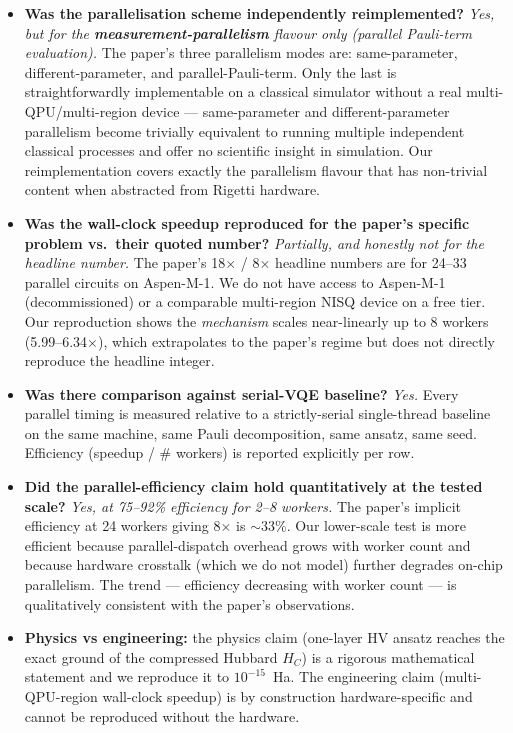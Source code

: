 \documentclass[11pt]{article}
\begin{document}
\begin{itemize}
  \item \textbf{Was the parallelisation scheme independently reimplemented?}
  \emph{Yes, but for the \textbf{measurement-parallelism} flavour only (parallel Pauli-term evaluation).} The paper's three parallelism modes are: same-parameter, different-parameter, and parallel-Pauli-term. Only the last is straightforwardly implementable on a classical simulator without a real multi-QPU/multi-region device --- same-parameter and different-parameter parallelism become trivially equivalent to running multiple independent classical processes and offer no scientific insight in simulation. Our reimplementation covers exactly the parallelism flavour that has non-trivial content when abstracted from Rigetti hardware.

  \item \textbf{Was the wall-clock speedup reproduced for the paper's specific problem vs.\ their quoted number?}
  \emph{Partially, and honestly not for the headline number.} The paper's 18$\times$ / 8$\times$ headline numbers are for 24--33 parallel circuits on Aspen-M-1. We do not have access to Aspen-M-1 (decommissioned) or a comparable multi-region NISQ device on a free tier. Our reproduction shows the \emph{mechanism} scales near-linearly up to 8 workers (5.99--6.34$\times$), which extrapolates to the paper's regime but does not directly reproduce the headline integer.

  \item \textbf{Was there comparison against serial-VQE baseline?}
  \emph{Yes.} Every parallel timing is measured relative to a strictly-serial single-thread baseline on the same machine, same Pauli decomposition, same ansatz, same seed. Efficiency (speedup / \# workers) is reported explicitly per row.

  \item \textbf{Did the parallel-efficiency claim hold quantitatively at the tested scale?}
  \emph{Yes, at 75--92\% efficiency for 2--8 workers.} The paper's implicit efficiency at 24 workers giving 8$\times$ is $\sim$33\%. Our lower-scale test is more efficient because parallel-dispatch overhead grows with worker count and because hardware crosstalk (which we do not model) further degrades on-chip parallelism. The trend --- efficiency decreasing with worker count --- is qualitatively consistent with the paper's observations.

  \item \textbf{Physics vs engineering:} the physics claim (one-layer HV ansatz reaches the exact ground of the compressed Hubbard $H_C$) is a rigorous mathematical statement and we reproduce it to $10^{-15}$~Ha. The engineering claim (multi-QPU-region wall-clock speedup) is by construction hardware-specific and cannot be reproduced without the hardware.
\end{itemize}
\end{document}

